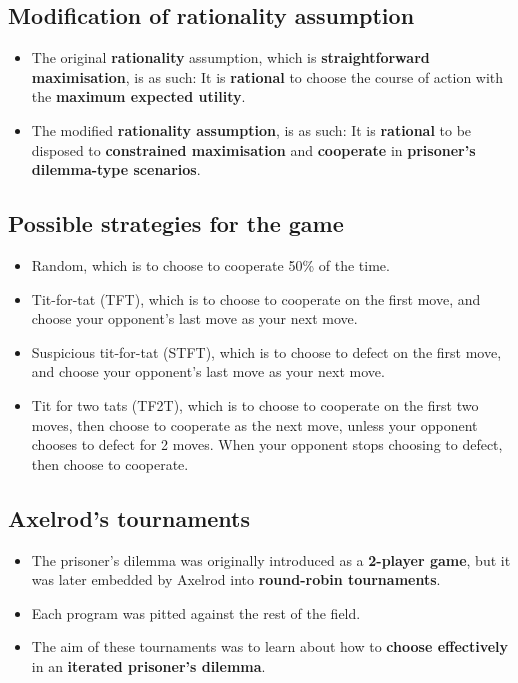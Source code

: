\documentclass[11pt]{article}
\begin{document}
 \newpage
\subsection{Modification of rationality assumption}
\label{sec:orgff8c086}
\begin{itemize}
\item The original \textbf{rationality} assumption, which is \textbf{straightforward maximisation}, is as such:
It is \textbf{rational} to choose the course of action with the \textbf{maximum expected utility}.
\item The modified \textbf{rationality assumption}, is as such:
It is \textbf{rational} to be disposed to \textbf{constrained maximisation} and \textbf{cooperate} in \textbf{prisoner's dilemma-type scenarios}.
\end{itemize}
\subsection{Possible strategies for the game}
\label{sec:orgb12f1b9}
\begin{itemize}
\item Random, which is to choose to cooperate 50\% of the time.
\item Tit-for-tat (TFT), which is to choose to cooperate on the first move, and choose your opponent's last move as your next move.
\item Suspicious tit-for-tat (STFT), which is to choose to defect on the first move, and choose your opponent's last move as your next move.
\item Tit for two tats (TF2T), which is to choose to cooperate on the first two moves, then choose to cooperate as the next move, unless your opponent chooses to defect for 2 moves. When your opponent stops choosing to defect, then choose to cooperate.
\end{itemize}
\subsection{Axelrod's tournaments}
\label{sec:org394f010}
\begin{itemize}
\item The prisoner's dilemma was originally introduced as a \textbf{2-player game}, but it was later embedded by Axelrod into \textbf{round-robin tournaments}.
\item Each program was pitted against the rest of the field.
\item The aim of these tournaments was to learn about how to \textbf{choose effectively} in an \textbf{iterated prisoner's dilemma}.
\end{itemize}
\end{document}
